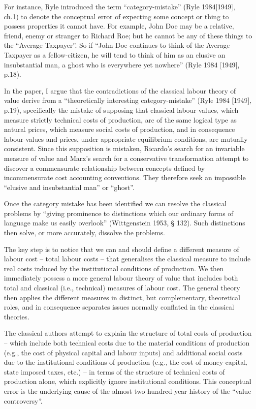 \documentclass[
]{book}
\begin{document}
For instance, Ryle introduced the term ``category-mistake'' (Ryle 1984{[}1949{]}, ch.1) to denote the conceptual error of expecting some concept or thing to possess properties it cannot have. For example, John Doe may be a relative, friend, enemy or stranger to Richard Roe; but he cannot be any of these things to the ``Average Taxpayer''. So if ``John Doe continues to think of the Average Taxpayer as a fellow-citizen, he will tend to think of him as an elusive an insubstantial man, a ghost who is everywhere yet nowhere'' (Ryle 1984 {[}1949{]}, p.18).

In the paper, I argue that the contradictions of the classical labour theory of value derive from a ``theoretically interesting category-mistake'' (Ryle 1984 {[}1949{]}, p.19), specifically the mistake of supposing that classical labour-values, which measure strictly technical costs of production, are of the same logical type as natural prices, which measure social costs of production, and in consequence labour-values and prices, under appropriate equilibrium conditions, are mutually consistent. Since this supposition is mistaken, Ricardo's search for an invariable measure of value and Marx's search for a conservative transformation attempt to discover a commensurate relationship between concepts defined by incommensurate cost accounting conventions. They therefore seek an impossible ``elusive and insubstantial man'' or ``ghost''.

Once the category mistake has been identified we can resolve the classical problems by ``giving prominence to distinctions which our ordinary forms of language make us easily overlook'' (Wittgenstein 1953, § 132). Such distinctions then solve, or more accurately, dissolve the problems.

The key step is to notice that we can and should define a different measure of labour cost -- total labour costs -- that generalises the classical measure to include real costs induced by the institutional conditions of production. We then immediately possess a more general labour theory of value that includes both total and classical (i.e., technical) measures of labour cost. The general theory then applies the different measures in distinct, but complementary, theoretical roles, and in consequence separates issues normally conflated in the classical theories.

The classical authors attempt to explain the structure of total costs of production -- which include both technical costs due to the material conditions of production (e.g., the cost of physical capital and labour inputs) and additional social costs due to the institutional conditions of production (e.g., the cost of money-capital, state imposed taxes, etc.) -- in terms of the structure of technical costs of production alone, which explicitly ignore institutional conditions. This conceptual error is the underlying cause of the almost two hundred year history of the ``value controversy''.
\end{document}
